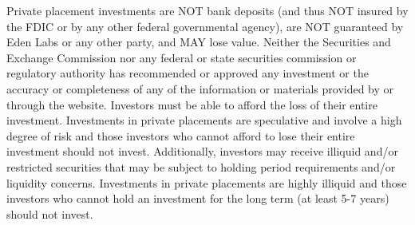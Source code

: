 \begin{flushleft}
    
    Private placement investments are NOT bank deposits (and thus NOT insured by the FDIC or by any other federal governmental agency), are NOT guaranteed by Eden Labs or any other party, and MAY lose value. Neither the Securities and Exchange Commission nor any federal or state securities commission or regulatory authority has recommended or approved any investment or the accuracy or completeness of any of the information or materials provided by or through the website. Investors must be able to afford the loss of their entire investment.  Investments in private placements are speculative and involve a high degree of risk and those investors who cannot afford to lose their entire investment should not invest. Additionally, investors may receive illiquid and/or restricted securities that may be subject to holding period requirements and/or liquidity concerns. Investments in private placements are highly illiquid and those investors who cannot hold an investment for the long term (at least 5-7 years) should not invest.
\end{flushleft}